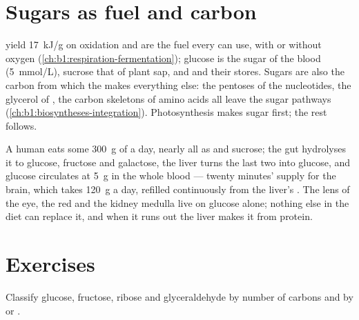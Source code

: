 \section{Sugars as fuel and carbon}

\begin{proposition}\label{prop:b1:carbohydrates:fuel}
 yield \qty{17}{kJ/g} on oxidation and are the fuel every
 can use, with or without oxygen (\cref{ch:b1:respiration-fermentation});
glucose is the sugar of the blood (\qty{5}{mmol/L}), sucrose that of
plant sap, and  and  their stores. Sugars are also the
carbon from which the  makes everything else: the pentoses of the
nucleotides, the glycerol of , the carbon skeletons of amino
acids all leave the sugar pathways (\cref{ch:b1:biosyntheses-integration}).
Photosynthesis makes sugar first; the rest follows.
\end{proposition}

\begin{example}\label{ex:b1:carbohydrates:day}
A human eats some \qty{300}{g} of  a day, nearly all as
 and sucrose; the gut hydrolyses it to glucose, fructose and
galactose, the liver turns the last two into glucose, and glucose
circulates at \qty{5}{g} in the whole blood --- twenty minutes' supply
for the brain, which takes \qty{120}{g} a day, refilled continuously
from the liver's . The lens of the eye, the red  and the
kidney medulla live on glucose alone; nothing else in the diet can
replace it, and when it runs out the liver makes it from protein.
\end{example}

\section{Exercises}

\begin{exercise}[$\star$]\label{exo:b1:carbohydrates:1}
Classify glucose, fructose, ribose and glyceraldehyde by number of
carbons and by  or .
\end{exercise}

